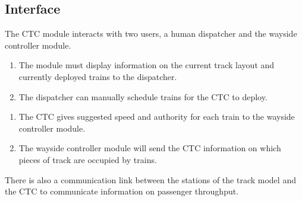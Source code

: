 \documentclass{scrreprt}
\begin{document}
\subsection{Interface}
The CTC module interacts with two users, a human dispatcher and the wayside controller
module.
\begin{enumerate}
    \item The module must display information on the current track layout and currently
    deployed trains to the dispatcher.
    \item The dispatcher can manually schedule trains for the CTC to deploy.
\end{enumerate}
\begin{enumerate}
    \item The CTC gives suggested speed and authority for each train to the wayside
    controller module.
    \item The wayside controller module will send the CTC information on which pieces of
    track are occupied by trains.
\end{enumerate}
There is also a communication link between the stations of the track model and the
CTC to communicate information on passenger throughput.
\end{document}
